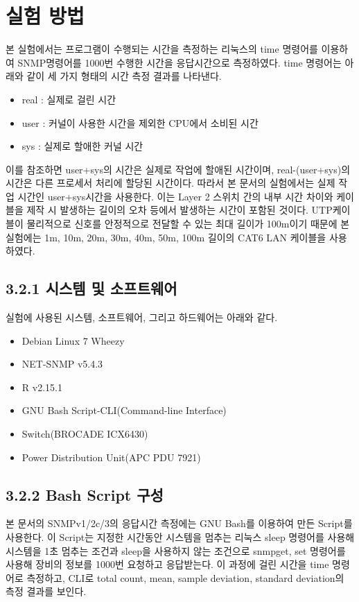\documentclass[11pt
  , a4paper
  , article
  , oneside
]{memoir}
\begin{document}
\section{실험 방법}
본 실험에서는 프로그램이 수행되는 시간을 측정하는 리눅스의 time 명령어를 이용하여 SNMP명령어를 1000번 수행한 시간을 응답시간으로 측정하였다. time 명령어는 아래와 같이 세 가지 형태의 시간 측정 결과를 나타낸다\citep{time_command}. 
\begin{itemize}
\item real : 실제로 걸린 시간
\item user : 커널이 사용한 시간을 제외한 CPU에서 소비된 시간
\item sys : 실제로 할애한 커널 시간
\end{itemize}
이를 참조하면 user+sys의 시간은 실제로 작업에 할애된 시간이며, real-(user+sys)의 시간은 다른 프로세서 처리에 할당된 시간이다. 따라서 본 문서의 실험에서는 실제 작업 시간인 user+sys시간을 사용한다. 이는 Layer 2 스위치 간의 내부 시간 차이와 케이블을 제작 시 발생하는 길이의 오차 등에서 발생하는 시간이 포함된 것이다. UTP케이블이 물리적으로 신호를 안정적으로 전달할 수 있는 최대 길이가 100m이기 때문에 본 실험에는 1m, 10m, 20m, 30m, 40m, 50m, 100m 길이의 CAT6 LAN 케이블을 사용하였다.

\subsection{3.2.1 시스템 및 소프트웨어}
실험에 사용된 시스템, 소프트웨어, 그리고 하드웨어는 아래와 같다.

\begin{itemize}
\item Debian Linux 7 Wheezy
\item NET-SNMP v5.4.3
\item R v2.15.1
\item GNU Bash Script-CLI(Command-line Interface) 
\item Switch(BROCADE ICX6430)
\item Power Distribution Unit(APC PDU 7921)
\end{itemize}

\subsection{3.2.2 Bash Script 구성}
본 문서의 SNMPv1/2c/3의 응답시간 측정에는 GNU Bash를 이용하여 만든 Script를 사용한다. 이 Script는 지정한 시간동안 시스템을 멈추는 리눅스 sleep 명령어를 사용해 시스템을 1초 멈추는 조건과 sleep을 사용하지 않는 조건으로 snmpget, set 명령어를 사용해 장비의 정보를 1000번 요청하고 응답받는다. 이 과정에 걸린 시간을 time 명령어로 측정하고, CLI로 total count, mean, sample deviation, standard deviation의 측정 결과를 보인다.
\end{document}
